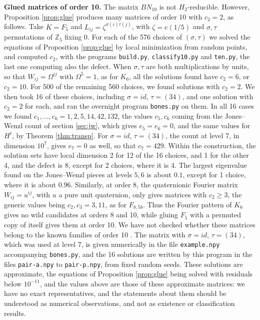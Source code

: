 \documentclass[11pt]{amsart}
\begin{document}
\noindent\textbf{Glued matrices of order 10.} The matrix $BN_{10}$ is not $H_2$-reducible. However, Proposition \ref{prop:glue} produces many matrices of order 10 with $c_2=2$, as follows. Take $K=F_5$ and $L_{ij}=\zeta^{\sigma(i)\tau(j)}$, with $\zeta=e(1/5)$ and $\sigma,\tau$ permutations of $\mathbb Z_5$ fixing 0. For each of the 576 choices of $(\sigma,\tau)$ we solved the equations of Proposition \ref{prop:glue} by local minimization from random points, and computed $c_2$, with the programs \texttt{build.py}, \texttt{classify10.py} and \texttt{ten.py}, the last one computing also the defect. When $\sigma,\tau$ are both multiplications by units, so that $W_{ij}=\Omega^{ij}$ with $\Omega^5=1$, as for $K_6$, all the solutions found have $c_2=6$, or $c_2=10$. For 500 of the remaining 560 choices, we found solutions with $c_2=2$. We then took 16 of these choices, including $\sigma=id$, $\tau=(34)$, and one solution with $c_2=2$ for each, and ran the overnight program \texttt{bones.py} on them. In all 16 cases we found $c_1,\ldots,c_6=1,2,5,14,42,132$, the values $c_5,c_6$ coming from the Jones--Wenzl count of section \ref{sec:jw}, which gives $e_5=e_6=0$, and the same values for $H^t$, by Theorem \ref{thm:transp}. For $\sigma=id$, $\tau=(34)$, the count at level 7, in dimension $10^7$, gives $e_7=0$ as well, so that $c_7=429$. Within the construction, the solution sets have local dimension 2 for 12 of the 16 choices, and 1 for the other 4, and the defect is 8, except for 2 choices, where it is 4. The largest eigenvalue found on the Jones--Wenzl pieces at levels $5,6$ is about $0.1$, except for 1 choice, where it is about $0.96$. Similarly, at order 8, the quaternionic Fourier matrix $W_{ij}=u^{ij}$, with $u$ a pure unit quaternion, only gives matrices with $c_2\geq3$, the generic values being $c_2,c_3=3,11$, as for $F_{8,5b}$. Thus the Fourier pattern of $K_6$ gives no wild candidates at orders 8 and 10, while gluing $F_5$ with a permuted copy of itself gives them at order 10. We have not checked whether these matrices belong to the known families of order 10 \cite{szp,tz1}. The matrix with $\sigma=id$, $\tau=(34)$, which was used at level 7, is given numerically in the file \texttt{example.npy} accompanying \texttt{bones.py}, and the 16 solutions are written by this program in the files \texttt{pair-a.npy} to \texttt{pair-p.npy}, from fixed random seeds. These solutions are approximate, the equations of Proposition \ref{prop:glue} being solved with residuals below $10^{-11}$, and the values above are those of these approximate matrices: we have no exact representatives, and the statements about them should be understood as numerical observations, and not as existence or classification results.
\end{document}
